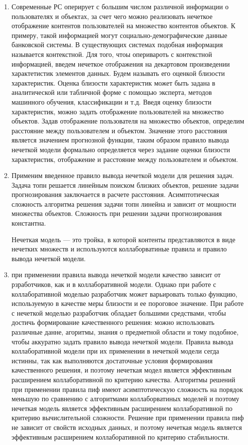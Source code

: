 \documentclass[a4paper,11pt]{proc}
\begin{document}
{\begin{enumerate}
	\item Современные РС оперирует с большим числом различной информации о
		пользователях и объектах, за счет чего можно реализовать нечеткое
		отображение контентов пользователей на
		множество контентов объектов. К примеру, такой информацией могут
		социально-демографические данные банковской системы. В существующих
		системах подобная информация называется контекстной.
		Для того, чтоы оперивароть с контекстной информацией,
		введем нечеткое отображения на декартовом произведении
		характетистик элементов данных. Будем называть его оценкой близости
		характеристик. Оценка близости характеристик может быть задана в
		аналитической или табличной форме с
		помощью эксперта, методов машинного обучения, классификации и т.д. Введя
		оценку близости характеристик,
		можно задать отображение пользователей на множество объектов.
		Задав отображение пользователя на множество объектов, определим
		расстояние между пользователем и объектом. Значение этого расстояния
		является значением прогнозной функции, таким образом правило вывода
		нечеткой модели формально определяется через задание оценки близости
		характеристик, отображение и расстояние между пользователем и объектом.

	\item Применим введенное правило вывода нечеткой модели для решения задач.
		Задача топн решается линейным поиском близких объектов, решение задачи
		прогнозирования заключается в расчете расстояния. Асимптотическая
		сложность алгоритма решения задачи топн линейна и зависит от мощности
		множества объектов. Сложность при решении задачи прогнозирования
		константна.

		Нечеткая модель --- это тройка, в которой контенты представляются в
		виде нечетких множеств и используются коллаборватиные правила и правило
		вывода нечеткой модели.

	\item при применении правила вывода нечеткой модели качество зависит от
		рзработчиков, как и в коллаборативной модели. Однако при работе с
		коллаборативной моделью разработчик может варьировать только функцию,
		используемую в качестве меры близости и ее пороговое значение. При
		работе с нечеткой моделью разработчик обладает большими средствами,
		чтобы достичь формирование качественного решения: можно использовать
		различные данне, агоритмы, знания о предметной области и тому подобное,
		чтобы аккуратно задать правило вывода нечеткой модели.
		Правила вывода коллаборативной модели при их применении
		в нечеткой модели сегда истинны, так как выполняются достаточные
		условия формирования качественного решения, и поэтому нечеткая модел
		является эффективным расширением коллаборативной по критерию качества.
		Алгоритмы решений при применении правила пиф имеют
		асимптотическую сложность на порядок меньшую по сравнению с алгоритмами
		коллаборватиных моделей и поэтому нечеткая модель является эффективным
		расширением коллаборативной по критерию вычислительной сложности.
		Решение при применении правила пиф не зависит
		от свойств исходных данных, и поэтому нечеткая модель является
		эффективным расширением коллаборативной по критерию стабильности.


\end{enumerate}}
\end{document}
